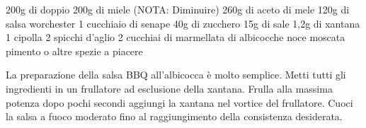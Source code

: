 \label{salsa-bbq}
\serves{-}
\begin{ingreds}
	200g di doppio 
	200g di miele (NOTA: Diminuire)
	260g di aceto di mele
	120g di salsa worchester
	1 cucchiaio di senape
	40g di zucchero
	15g di sale
	1,2g di xantana
	1 cipolla
	2 spicchi d'aglio
	2 cucchiai di marmellata di albicocche
	noce moscata
	pimento o altre spezie a piacere

\end{ingreds}

\begin{method}
La preparazione della salsa BBQ all'albicocca è molto semplice. Metti tutti gli ingredienti in un frullatore ad esclusione della xantana. Frulla alla massima potenza dopo pochi secondi aggiungi la xantana nel vortice del frullatore.
Cuoci la salsa a fuoco moderato fino al raggiungimento della consistenza desiderata.
\end{method}



